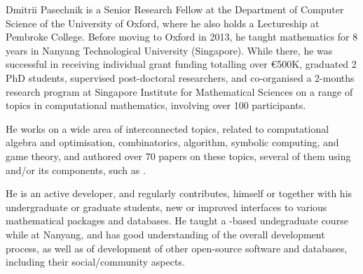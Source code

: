 \begin{participant}[type=leadPI,PM=24,salary=7000,gender=male]{Dmitrii Pasechnik}
  is a Senior Research Fellow at the Department of Computer Science of the University of
  Oxford, where he also holds a Lectureship at Pembroke College. Before moving to Oxford
  in 2013, he taught mathematics for 8 years in Nanyang Technological University
  (Singapore). While there, he was successful in receiving individual grant funding
  totalling over \euro 500K, graduated 2 PhD students, supervised post-doctoral
  researchers, and co-organised a 2-months research program at Singapore Institute for
  Mathematical Sciences on a range of topics in computational mathematics, involving over
  100 participants.

  He works on a wide area of interconnected topics, related to computational algebra and
  optimisation, combinatorics, algorithm, symbolic computing, and game theory, and
  authored over 70 papers on these topics, several of them using \Sage and/or its
  components, such as \GAP.

  He is an active \Sage developer, and regularly contributes, himself or together with his
  undergraduate or graduate students, new or improved \Sage interfaces to various
  mathematical packages and databases. He taught a \Sage-based undegraduate course while at
  Nanyang, and has good understanding of the overall \Sage development process, as well as
  of development of other open-source software and databases, including their
  social/community aspects.
\end{participant}
